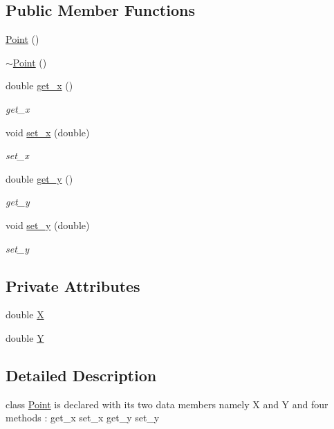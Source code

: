 \subsection*{Public Member Functions}
\begin{DoxyCompactItemize}
\item 
\hyperlink{classPoint_ad92f2337b839a94ce97dcdb439b4325a}{Point} ()
\item 
\hyperlink{classPoint_a395fa04b4ec126b66fc053f829a30cc1}{$\sim$\+Point} ()
\item 
double \hyperlink{classPoint_a7467a9db2eb234926884cf88c638da93}{get\+\_\+x} ()
\begin{DoxyCompactList}\small\item\em get\+\_\+x \end{DoxyCompactList}\item 
void \hyperlink{classPoint_a2db17626051c9c14986b40c403305c09}{set\+\_\+x} (double)
\begin{DoxyCompactList}\small\item\em set\+\_\+x \end{DoxyCompactList}\item 
double \hyperlink{classPoint_a30cce78a200b5577b03e1c9c1b1f9ad8}{get\+\_\+y} ()
\begin{DoxyCompactList}\small\item\em get\+\_\+y \end{DoxyCompactList}\item 
void \hyperlink{classPoint_a787785e71cb38bd2d3c3dece4684d89e}{set\+\_\+y} (double)
\begin{DoxyCompactList}\small\item\em set\+\_\+y \end{DoxyCompactList}\end{DoxyCompactItemize}
\subsection*{Private Attributes}
\begin{DoxyCompactItemize}
\item 
double \hyperlink{classPoint_a9a3d900d37caa93c8266045f9a15ddfd}{X}
\item 
double \hyperlink{classPoint_afd3632a85aefc15a129a8ebc4b8412b9}{Y}
\end{DoxyCompactItemize}


\subsection{Detailed Description}
class \hyperlink{classPoint}{Point} is declared with its two data members namely X and Y and four methods \+: get\+\_\+x set\+\_\+x get\+\_\+y set\+\_\+y 

